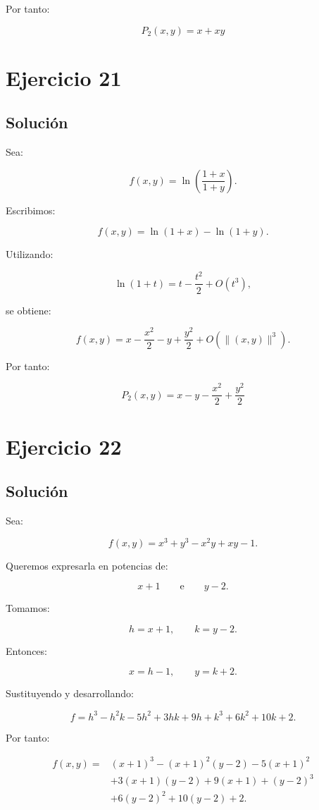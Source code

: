 \documentclass[11pt,a4paper]{article}
\begin{document}
Por tanto:

\[
\boxed{
P_2(x,y)
=
x+xy
}
\]

\section{Ejercicio 21}
\subsection{Solución}

Sea:

\[
f(x,y)
=
\ln\left(
\frac{1+x}{1+y}
\right).
\]

Escribimos:

\[
f(x,y)
=
\ln(1+x)-\ln(1+y).
\]

Utilizando:

\[
\ln(1+t)
=
t-\frac{t^2}{2}+O(t^3),
\]

se obtiene:

\[
f(x,y)
=
x-\frac{x^2}{2}
-
y+\frac{y^2}{2}
+
O\left(\|(x,y)\|^3\right).
\]

Por tanto:

\[
\boxed{
P_2(x,y)
=
x-y-\frac{x^2}{2}+\frac{y^2}{2}
}
\]

\section{Ejercicio 22}
\subsection{Solución}

Sea:

\[
f(x,y)
=
x^3+y^3-x^2y+xy-1.
\]

Queremos expresarla en potencias de:

\[
x+1
\qquad\text{e}\qquad
y-2.
\]

Tomamos:

\[
h=x+1,
\qquad
k=y-2.
\]

Entonces:

\[
x=h-1,
\qquad
y=k+2.
\]

Sustituyendo y desarrollando:

\[
f
=
h^3-h^2k-5h^2+3hk+9h
+k^3+6k^2+10k+2.
\]

Por tanto:

\[
\boxed{
\begin{aligned}
f(x,y)
={}&
(x+1)^3
-(x+1)^2(y-2)
-5(x+1)^2\\
&+
3(x+1)(y-2)
+
9(x+1)
+
(y-2)^3\\
&+
6(y-2)^2
+
10(y-2)
+
2.
\end{aligned}
}
\]
\end{document}
